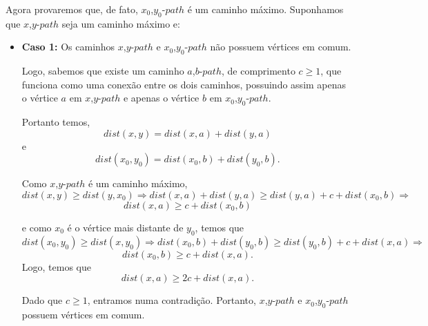\documentclass[a4paper,12pt]{article}
\begin{document}
    	Agora provaremos que, de fato, $x_0$,$y_0$-$path$ é um
    	caminho máximo.
    	Suponhamos que $x$,$y$-$path$ seja um caminho máximo e:

    	\begin{itemize}
            \item \textbf{Caso 1:} Os caminhos $x$,$y$-$path$ e 
            $x_0$,$y_0$-$path$ não possuem vértices em comum.

            Logo, sabemos que existe um caminho $a$,$b$-$path$, 
            de comprimento $c \ge 1$,
            que funciona como uma conexão entre os dois caminhos,
            possuindo assim apenas o vértice $a$ em 
            $x$,$y$-$path$ e apenas o vértice $b$ em
            $x_0$,$y_0$-$path$.

            Portanto temos,
            $$ dist(x,y) = dist(x,a) + dist(y,a) $$ e
            $$ dist(x_0,y_0) = dist(x_0,b) + dist(y_0,b).$$

            Como $x$,$y$-$path$ é um caminho máximo,
            $$ dist(x,y)\ge dist(y,x_0) \Rightarrow 
            dist(x,a)+dist(y,a)\ge dist(y,a)+c+dist(x_0,b)
            \Rightarrow$$
            $$ dist(x,a)\ge c+dist(x_0,b) $$

            e como $x_0$ é o vértice mais distante de $y_0$, 
            temos que 
            $$ dist(x_0,y_0)\ge dist(x,y_0) \Rightarrow 
            dist(x_0,b) + dist(y_0,b)\ge dist(y_0,b) + c + 
            dist(x,a) \Rightarrow $$
            $$ dist(x_0,b)\ge c + dist(x,a). $$ 
            Logo, temos que
            $$ dist(x,a)\ge 2c + dist(x, a). $$

            Dado que $c\ge 1$, entramos numa contradição. 
            Portanto, $x$,$y$-$path$ e $x_0$,$y_0$-$path$
            possuem vértices em comum.



\end{itemize}
\end{document}
